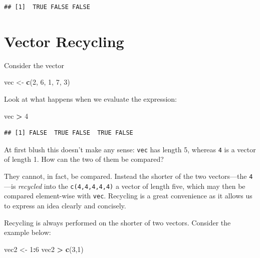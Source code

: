 \documentclass[]{book}
\makeatletter
\newenvironment{Shaded}{\begin{snugshade}}{\end{snugshade}}
\newcommand{\KeywordTok}[1]{\textcolor[rgb]{0.13,0.29,0.53}{\textbf{#1}}}
\newcommand{\DecValTok}[1]{\textcolor[rgb]{0.00,0.00,0.81}{#1}}
\newcommand{\StringTok}[1]{\textcolor[rgb]{0.31,0.60,0.02}{#1}}
\newcommand{\OperatorTok}[1]{\textcolor[rgb]{0.81,0.36,0.00}{\textbf{#1}}}
\newcommand{\NormalTok}[1]{#1}
\newenvironment{kframe}{%
\medskip{}
\setlength{\fboxsep}{.8em}
 \def\at@end@of@kframe{}%
 \ifinner\ifhmode%
  \def\at@end@of@kframe{\end{minipage}}%
  \begin{minipage}{\columnwidth}%
 \fi\fi%
 \def\FrameCommand##1{\hskip\@totalleftmargin \hskip-\fboxsep
 \colorbox{shadecolor}{##1}\hskip-\fboxsep
     \hskip-\linewidth \hskip-\@totalleftmargin \hskip\columnwidth}%
 \MakeFramed {\advance\hsize-\width
   \@totalleftmargin\z@ \linewidth\hsize
   \@setminipage}}%
 {\par\unskip\endMakeFramed%
 \at@end@of@kframe}
\renewenvironment{Shaded}{\begin{kframe}}{\end{kframe}}
\theoremstyle{definition}
\theoremstyle{definition}
\theoremstyle{definition}
\theoremstyle{remark}
\makeatother
\begin{document}
\begin{verbatim}
## [1]  TRUE FALSE FALSE
\end{verbatim}

\section{\texorpdfstring{Vector Recycling
}{Vector Recycling }}\label{vector-recycling}

Consider the vector

\begin{Shaded}
\begin{Highlighting}[]
\NormalTok{vec <-}\StringTok{ }\KeywordTok{c}\NormalTok{(}\DecValTok{2}\NormalTok{, }\DecValTok{6}\NormalTok{, }\DecValTok{1}\NormalTok{, }\DecValTok{7}\NormalTok{, }\DecValTok{3}\NormalTok{)}
\end{Highlighting}
\end{Shaded}

Look at what happens when we evaluate the expression:

\begin{Shaded}
\begin{Highlighting}[]
\NormalTok{vec }\OperatorTok{>}\StringTok{ }\DecValTok{4}
\end{Highlighting}
\end{Shaded}

\begin{verbatim}
## [1] FALSE  TRUE FALSE  TRUE FALSE
\end{verbatim}

At first blush this doesn't make any sense: \texttt{vec} has length 5,
whereas \texttt{4} is a vector of length 1. How can the two of them be
compared?

They cannot, in fact, be compared. Instead the shorter of the two
vectors---the \texttt{4}---is \emph{recycled} into the
\texttt{c(4,4,4,4,4)} a vector of length five, which may then be
compared element-wise with \texttt{vec}. Recycling is a great
convenience as it allows us to express an idea clearly and concisely.

Recycling is always performed on the shorter of two vectors. Consider
the example below:

\begin{Shaded}
\begin{Highlighting}[]
\NormalTok{vec2 <-}\StringTok{ }\DecValTok{1}\OperatorTok{:}\DecValTok{6}
\NormalTok{vec2 }\OperatorTok{>}\StringTok{ }\KeywordTok{c}\NormalTok{(}\DecValTok{3}\NormalTok{,}\DecValTok{1}\NormalTok{)}
\end{Highlighting}
\end{Shaded}
\end{document}
